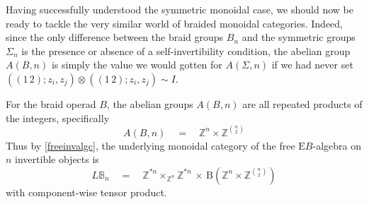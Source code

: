 \documentclass{amsbook} %
\numberwithin{section}{chapter}
\begin{document}
Having successfully understood the symmetric monoidal case, we should now be ready to tackle the very similar world of braided monoidal categories. Indeed, since the only difference between the braid groups $B_{n}$ and the symmetric groups $\Sigma_{n}$ is the presence or absence of a self-invertibility condition, the abelian group $A(B,n)$ is simply the value we would gotten for $A(\Sigma,n)$ if we had never set $((1 \, 2); z_i, z_j) \otimes ((1 \, 2); z_i, z_j) \sim I$.

\begin{prop} \label{invbraidcat} For the braid operad $B$, the abelian groups $A(B,n)$ are all repeated products of the integers, specifically
\[ A(B,n) \quad = \quad \mathbb{Z}^{n} \times \mathbb{Z}^{{n}\choose{2}} \]
Thus by \cref{freeinvalgc}, the underlying monoidal category of the free $\mathrm{E}B$-algebra on $n$ invertible objects is
\[ L\mathbb{B}_n \quad = \quad \mathbb{Z}^{\ast n} \times_{\mathbb{Z}^n} \mathbb{Z}^{\ast n}  \, \times \, \mathrm{B}(\mathbb{Z}^{n} \times \mathbb{Z}^{{n}\choose{2}} ) \]
with component-wise tensor product.
\end{prop}
\end{document}
